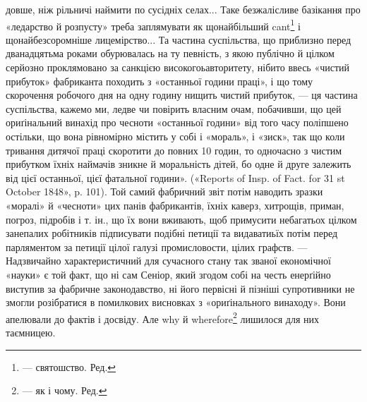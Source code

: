 довше, ніж рільничі наймити по сусідніх селах... Таке безжалісливе базікання
про «ледарство й розпусту» треба заплямувати як щонайбільший cant\footnote*{
— святошство. Ред.
} і щонайбезсоромніше
лицемірство... Та частина суспільства, що приблизно перед дванадцятьма роками обурювалась на ту
певність, з якою публічно й цілком серйозно проклямовано за санкцією високогоьавторитету, нібито
ввесь «чистий прибуток» фабриканта походить з «останньої години праці», і що тому скорочення
робочого дня на одну
годину нищить чистий прибуток, — ця частина суспільства, кажемо ми,
ледве чи повірить власним очам, побачивши, що цей ориґінальний винахід
про чесноти «останньої години» від того часу поліпшено остільки, що вона
рівномірно містить у собі і «мораль», і «зиск», так що коли тривання дитячої праці скоротити до
повних 10 годин, то одночасно з чистим прибутком їхніх наймачів зникне й моральність дітей, бо одне
й друге залежить від цієї останньої, цієї фатальної години». («Reports of Insp. of Fact. for 31 st
October 1848», p. 101). Той самий фабричний звіт потім наводить
зразки «моралі» й «чесноти» цих панів фабрикантів, їхніх каверз, хитрощів,
приман, погроз, підробів і т. ін., що їх вони вживають, щоб примусити небагатьох цілком занепалих
робітників підписувати подібні петиції та видаватиьїх потім перед парляментом за петиції цілої
галузі промисловости, цілих графств. — Надзвичайно характеристичний для сучасного стану так званої
економічної «науки» є той факт, що ні сам Сеніор, який згодом собі на честь енерґійно виступив за
фабричне законодавство, ні його первісні
й пізніші супротивники не змогли розібратися в помилкових висновках з «ориґінального винаходу». Вони
апелювали до фактів і досвіду. Але why й wherefore\footnote*{
— як і чому. Ред.
} лишилося для них таємницею.
\parbreak{}  %
